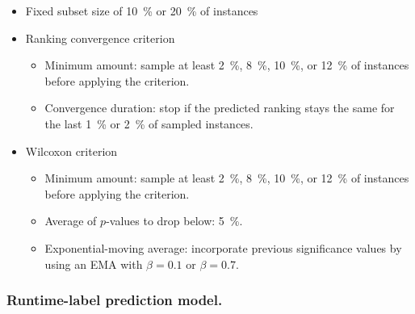 \documentclass[runningheads]{llncs}
\begin{document}
\begin{itemize}
  \item Fixed subset size of \SI{10}{\%} or \SI{20}{\%} of instances
  \item Ranking convergence criterion
  \begin{itemize}
    \item Minimum amount: sample at least \SI{2}{\%}, \SI{8}{\%}, \SI{10}{\%}, or \SI{12}{\%} of instances before applying the criterion.
    \item Convergence duration: stop if the predicted ranking stays the same for the last \SI{1}{\%} or \SI{2}{\%} of sampled instances.
  \end{itemize}

  \item Wilcoxon criterion
  \begin{itemize}
    \item Minimum amount: sample at least \SI{2}{\%}, \SI{8}{\%}, \SI{10}{\%}, or \SI{12}{\%} of instances before applying the criterion.
    \item Average of $p$-values to drop below: \SI{5}{\%}.
    \item Exponential-moving average: incorporate previous significance values by using an EMA with $\beta = 0.1$ or $\beta = 0.7$.
  \end{itemize}
\end{itemize}

\subsubsection{Runtime-label prediction model.}
\end{document}
